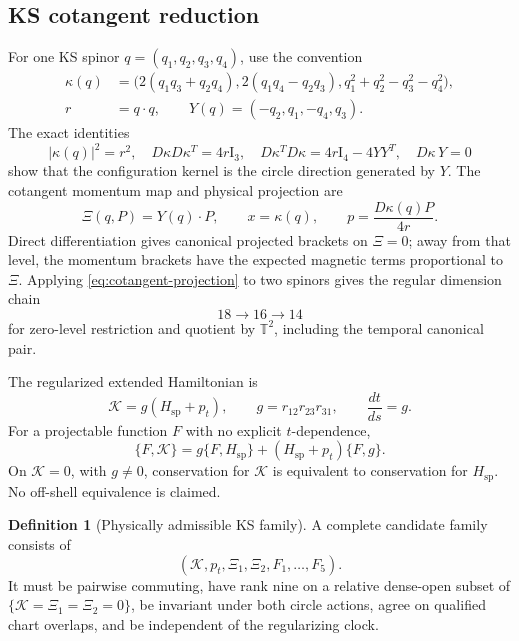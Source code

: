 \documentclass[11pt]{article}
\theoremstyle{definition}
\newtheorem{definition}[theorem]{Definition}
\theoremstyle{remark}
\newcommand{\T}{\mathbb{T}}
\newcommand{\XiMap}{\Xi}
\newcommand{\Id}{\mathrm{I}}
\begin{document}
\subsection{KS cotangent reduction}

For one KS spinor \(q=(q_1,q_2,q_3,q_4)\), use the convention
\cite{kustaanheimostiefel1965}
\begin{align}
\kappa(q)&=\bigl(
  2(q_1q_3+q_2q_4),
  2(q_1q_4-q_2q_3),
  q_1^2+q_2^2-q_3^2-q_4^2
\bigr),\nonumber\\
r&=q\cdot q,\qquad
Y(q)=(-q_2,q_1,-q_4,q_3).
\label{eq:ks-map}
\end{align}
The exact identities
\[
|\kappa(q)|^2=r^2,\quad
D\kappa D\kappa^{T}=4r\Id_3,\quad
D\kappa^{T}D\kappa=4r\Id_4-4YY^{T},\quad
D\kappa\,Y=0
\]
show that the configuration kernel is the circle direction generated by
\(Y\).  The cotangent momentum map and physical projection are
\begin{equation}
\XiMap(q,P)=Y(q)\cdot P,\qquad
x=\kappa(q),\qquad
p=\frac{D\kappa(q)P}{4r}.
\label{eq:cotangent-projection}
\end{equation}
Direct differentiation gives canonical projected brackets on
\(\XiMap=0\); away from that level, the momentum brackets have the expected
magnetic terms proportional to \(\XiMap\).  Applying
\eqref{eq:cotangent-projection} to two spinors gives the regular dimension
chain
\[
18\longrightarrow16\longrightarrow14
\]
for zero-level restriction and quotient by \(\T^2\), including the temporal
canonical pair.

The regularized extended Hamiltonian is
\begin{equation}
\mathcal K=g(H_{\mathrm{sp}}+p_t),\qquad
g=r_{12}r_{23}r_{31},\qquad
\frac{dt}{ds}=g.
\label{eq:sundman}
\end{equation}
For a projectable function \(F\) with no explicit \(t\)-dependence,
\[
\{F,\mathcal K\}
=g\{F,H_{\mathrm{sp}}\}
 +(H_{\mathrm{sp}}+p_t)\{F,g\}.
\]
On \(\mathcal K=0\), with \(g\ne0\), conservation for \(\mathcal K\) is
equivalent to conservation for \(H_{\mathrm{sp}}\).  No off-shell equivalence
is claimed.

\begin{definition}[Physically admissible KS family]
A complete candidate family consists of
\[
(\mathcal K,p_t,\XiMap_1,\XiMap_2,F_1,\ldots,F_5).
\]
It must be pairwise commuting, have rank nine on a relative dense-open subset
of \(\{\mathcal K=\XiMap_1=\XiMap_2=0\}\), be invariant under both circle
actions, agree on qualified chart overlaps, and be independent of the
regularizing clock.
\end{definition}
\end{document}
